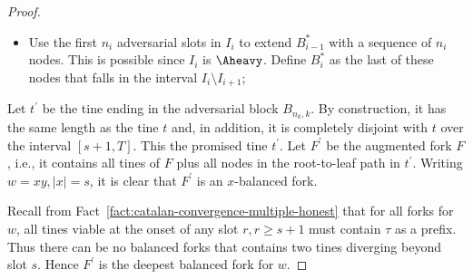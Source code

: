 \begin{proof}
\begin{itemize}
      \item Use the first $n_i$ adversarial slots in $I_i$ 
      to extend $B_{i-1}^*$ with a sequence of $n_i$ nodes. 
      This is possible since $I_i$ is $\Aheavy$. 
      Define $B_i^*$ as the last of these nodes 
      that falls in the interval $I_i \setminus I_{i+1}$; 
    \end{itemize}
    Let $t^\prime$ be 
    the tine ending in the adversarial block $B_{n_k, k}$. 
    By construction, it has the same length as the tine $t$ 
    and, in addition, it is completely disjoint with $t$ over the interval $[s + 1, T]$. 
    This the promised tine $t^\prime$. 
    Let $F^\prime$ be the augmented fork $F$, i.e., 
    it contains all tines of $F$ plus all nodes in the root-to-leaf path in $t^\prime$. 
    Writing $w = xy, |x| = s$, it is clear that $F^\prime$ is an $x$-balanced fork.  

    Recall from Fact~\ref{fact:catalan-convergence-multiple-honest} that 
    for all forks for $w$, all tines viable at the onset of any slot $r, r \geq s + 1$ 
    must contain $\tau$ as a prefix. 
    Thus there can be no balanced forks that contains two tines diverging beyond slot $s$. 
    Hence $F^\prime$ is the deepest balanced fork for $w$.
  \end{proof}






